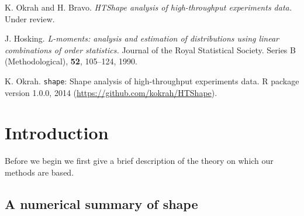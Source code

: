 \documentclass[a4paper, 10pt]{article}\usepackage[]{graphicx}\usepackage[]{color}
\begin{document}
\renewcommand\refname{\vskip -1cm} 

\begin{thebibliography}{9}

\makeatletter
\renewcommand\@biblabel[1]{\textbullet}
\makeatother

 K. Okrah and H. Bravo. 
         \emph{HTShape analysis of high-throughput experiments data.}  
         Under review.
         
 J. Hosking. 
         \emph{L-moments: analysis and estimation 
               of distributions using linear 
               combinations of order statistics.}    
               Journal of the Royal Statistical Society. 
               Series B (Methodological),
               \textbf{52}, 105--124, 1990.                 
               
 K. Okrah.
          \texttt{shape}: Shape analysis of high-throughput 
          experiments data. 
          R package version 1.0.0,
          2014 (\url{https://github.com/kokrah/HTShape}).
          
\end{thebibliography}

\newpage

\tableofcontents

\newpage

\section{Introduction}

Before we begin we first give a brief
description of the theory on which
our methods are based.

\subsection{A numerical summary of shape}
\end{document}
